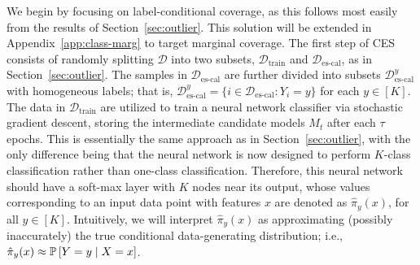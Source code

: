 We begin by focusing on label-conditional coverage, as this follows most easily from the results of Section~\ref{sec:outlier}. This solution will be extended in Appendix~\ref{app:class-marg} to target marginal coverage.
The first step of CES consists of randomly splitting $\mathcal{D}$ into two subsets, $\mathcal{D}_{\text{train}}$ and $\mathcal{D}_{\text{es-cal}}$, as in Section~\ref{sec:outlier}. The samples in $\mathcal{D}_{\text{es-cal}}$ are further divided into subsets $\mathcal{D}^y_{\text{es-cal}}$ with homogeneous labels; that is, $\mathcal{D}^y_{\text{es-cal}} = \{i \in \mathcal{D}_{\text{es-cal}} : Y_i = y \}$ for each $y \in [K]$.
The data in $\mathcal{D}_{\text{train}}$ are utilized to train a neural network classifier via stochastic gradient descent, storing the intermediate candidate models $M_t$ after each $\tau$ epochs.
This is essentially the same approach as in Section~\ref{sec:outlier}, with the only difference being that the neural network is now designed to perform $K$-class classification rather than one-class classification. Therefore, this neural network should have a soft-max layer with $K$ nodes near its output, whose values corresponding to an input data point with features $x$ are denoted as $\hat{\pi}_y(x)$, for all $y \in [K]$.
Intuitively, we will interpret $\hat{\pi}_y(x)$ as approximating (possibly inaccurately) the true conditional data-generating distribution; i.e., $\hat{\pi}_{y}(x) \approx \P{Y=y \mid X=x}$.


